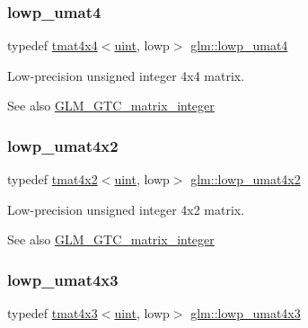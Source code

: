 \subsubsection{\texorpdfstring{lowp\+\_\+umat4}{lowp\_umat4}}
{\footnotesize\ttfamily typedef \hyperlink{structglm_1_1tmat4x4}{tmat4x4}$<$\hyperlink{group__core__precision_ga4fd29415871152bfb5abd588334147c8}{uint}, lowp$>$ \hyperlink{group__gtc__matrix__integer_gaa430d894a3290d551061d0d77c017cec}{glm\+::lowp\+\_\+umat4}}

Low-\/precision unsigned integer 4x4 matrix. \begin{DoxySeeAlso}{See also}
\hyperlink{group__gtc__matrix__integer}{G\+L\+M\+\_\+\+G\+T\+C\+\_\+matrix\+\_\+integer} 
\end{DoxySeeAlso}
\mbox{\label{group__gtc__matrix__integer_ga5f4e6bb892b20b532bd9caa9aee120b9}} 
\subsubsection{\texorpdfstring{lowp\+\_\+umat4x2}{lowp\_umat4x2}}
{\footnotesize\ttfamily typedef \hyperlink{structglm_1_1tmat4x2}{tmat4x2}$<$\hyperlink{group__core__precision_ga4fd29415871152bfb5abd588334147c8}{uint}, lowp$>$ \hyperlink{group__gtc__matrix__integer_ga5f4e6bb892b20b532bd9caa9aee120b9}{glm\+::lowp\+\_\+umat4x2}}

Low-\/precision unsigned integer 4x2 matrix. \begin{DoxySeeAlso}{See also}
\hyperlink{group__gtc__matrix__integer}{G\+L\+M\+\_\+\+G\+T\+C\+\_\+matrix\+\_\+integer} 
\end{DoxySeeAlso}
\mbox{\label{group__gtc__matrix__integer_gae94cb13770f09d0a086e6fb627f47b84}} 
\subsubsection{\texorpdfstring{lowp\+\_\+umat4x3}{lowp\_umat4x3}}
{\footnotesize\ttfamily typedef \hyperlink{structglm_1_1tmat4x3}{tmat4x3}$<$\hyperlink{group__core__precision_ga4fd29415871152bfb5abd588334147c8}{uint}, lowp$>$ \hyperlink{group__gtc__matrix__integer_gae94cb13770f09d0a086e6fb627f47b84}{glm\+::lowp\+\_\+umat4x3}}

